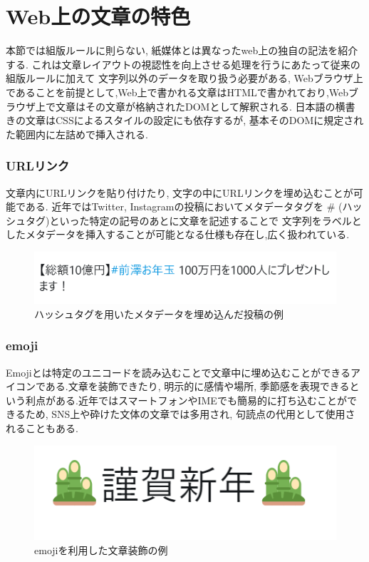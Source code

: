 \section {Web上の文章の特色}
本節では組版ルールに則らない, 紙媒体とは異なったweb上の独自の記法を紹介する.
これは文章レイアウトの視認性を向上させる処理を行うにあたって従来の組版ルールに加えて
文字列以外のデータを取り扱う必要がある,
Webブラウザ上であることを前提として,Web上で書かれる文章はHTMLで書かれており,Webブラウザ上で文章はその文章が格納されたDOMとして解釈される.
日本語の横書きの文章はCSSによるスタイルの設定にも依存するが, 基本そのDOMに規定された範囲内に左詰めで挿入される.


\subsubsection{URLリンク}

文章内にURLリンクを貼り付けたり, 文字の中にURLリンクを埋め込むことが可能である.
近年ではTwitter, Instagramの投稿においてメタデータタグを \# (ハッシュタグ)といった特定の記号のあとに文章を記述することで
文字列をラベルとしたメタデータを挿入することが可能となる仕様も存在し,広く扱われている.
\begin{figure}[H]
    \centering
    \label{fig:hush}
    \includegraphics[width=0.6\columnwidth]{image/02/img_3.png}
    \caption[ハッシュタグを用いたメタデータを埋め込んだ投稿の例]{ハッシュタグを用いたメタデータを埋め込んだ投稿の例\footnotemark[1]}
\end{figure}


\subsubsection{emoji}
Emojiとは特定のユニコードを読み込むことで文章中に埋め込むことができるアイコンである.文章を装飾できたり, 
明示的に感情や場所, 季節感を表現できるという利点がある.近年ではスマートフォンやIMEでも簡易的に打ち込むことができるため, 
SNS上や砕けた文体の文章では多用され, 句読点の代用として使用されることもある.
\begin{figure}[H]
    \centering
    \label{fig:emoji}
    \includegraphics[width=0.6\columnwidth]{image/02/img_1.png}
    \caption[emojiを利用した文章装飾の例]{emojiを利用した文章装飾の例}
\end{figure}

